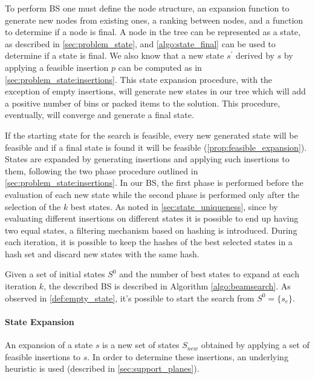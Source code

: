 To perform BS one must define the node structure, an expansion function to generate new nodes from existing ones, a ranking between nodes, and a function to determine if a node is final.
A node in the tree can be represented as a state, as described in  \cref{sec:problem_state}, and \cref{algo:state_final} can be used to determine if a state is final. We also know that a new state $s^\prime$ derived by $s$ by applying a feasible insertion $p$ can be computed as in \cref{sec:problem_state:insertions}.
This state expansion procedure, with the exception of empty insertions, will generate new states in our tree which will add a positive number of bins or packed items to the solution. This procedure, eventually, will converge and generate a final state.

If the starting state for the search is feasible, every new generated state will be feasible and if a final state is found it will be feasible (\cref{prop:feasible_expansion}).
States are expanded by generating insertions and applying such insertions to them, following the two phase procedure outlined in \cref{sec:problem_state:insertions}. In our BS, the first phase is performed before the evaluation of each new state while the second phase is performed only after the selection of the $k$ best states.
As noted in \cref{sec:state_uniqueness}, since by evaluating different insertions on different states it is possible to end up having two equal states, a filtering mechanism based on hashing is introduced.
During each iteration, it is possible to keep the hashes of the best selected states in a hash set and discard new states with the same hash.

Given a set of initial states $S^0$ and the number of best states to expand at each iteration $k$, the described BS is described in Algorithm \ref{algo:beamsearch}.
As observed in \cref{def:empty_state}, it's possible to start the search from $S^0 = \{ s_e \}$.



\paragraph*{State Expansion}

An expansion of a state $s$ is a new set of states $S_{new}$ obtained by applying a set of feasible insertions to $s$. In order to determine these insertions, an underlying heuristic is used (described in \cref{sec:support_planes}).

